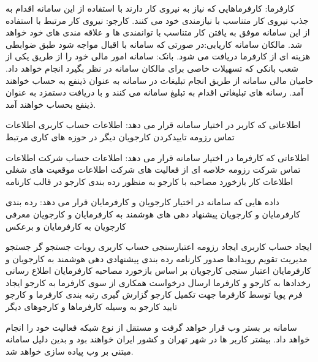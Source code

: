   کارفرما: کارفرماهایی که نیاز به نیروی کار دارند با استفاده از این سامانه اقدام به جذب نیروی کار متناسب با نیازمندی خود می کنند.    
  کارجو: نیروی کار مرتبط با استفاده از این سامانه موفق به یافتن کار متناسب با توانمندی ها و علاقه مندی های خود خواهد شد.
  مالکان سامانه کاریابی:در صورتی که سامانه با اقبال مواجه شود طبق  ضوابطی هزینه ای از کارفرما دریافت می شود.
 بانک: سامانه امور مالی خود را از طریق یکی از شعب بانکی که تسهیلات خاصی برای مالکان سامانه در نظر بگیرد انجام خواهد داد. 
  حامیان مالی سامانه از طریق انجام تبلیغات در سامانه  به عنوان ذینفع به حساب خواهند آمد.
 رسانه های تبلیغاتی اقدام به تبلیغ سامانه می کنند و با دریافت دستمزد به عنوان ذینفع بحساب خواهند آمد.

اطلاعاتی که کاربر در اختیار سامانه قرار می دهد:
 اطلاعات حساب کاربری
 اطلاعات تماس 
 رزومه
 تاییدکردن کارجویان دیگر در حوزه های کاری مرتبط 

اطلاعاتی که کارفرما در اختیار سامانه قرار می دهد:
 اطلاعات حساب شرکت
 اطلاعات تماس شرکت
 رزومه
 خلاصه ای از فعالیت های شرکت
 اطلاعات موقعیت های شغلی
 اطلاعات کار 
 بازخورد مصاحبه با کارجو به منظور رده بندی کارجو در قالب کارنامه

داده هایی که سامانه در اختیار کارجویان و کارفرمایان قرار می دهد:
        رده بندی کارفرمایان و کارجویان 
        پیشنهاد دهی های هوشمند به کارفرمایان و کارجویان 
        معرفی کارجویان به کارفرمایان و برعکس


 ایجاد حساب کاربری
 ایجاد رزومه
 اعتبارسنجی حساب کاربری
 روبات جستجو گر
 جستجو 
 مدیریت تقویم رویدادها
 صدور کارنامه
 رده بندی 
 پیشنهادی دهی هوشمند به کارجویان و کارفرمایان
 اعتبار سنجی کارجویان بر اساس بازخورد مصاحبه کارفرمایان
 اطلاع رسانی رخدادها به کارجو و کارفرما
 ارسال درخواست همکاری از سوی کارفرما به کارجو
 ایجاد فرم پویا توسط کارفرما جهت تکمیل کارجو
 گزارش گیری
 رتبه بندی کارفرما و کارجو 
 تایید کارجو به وسیله کارفرماها و کارجوهای دیگر

سامانه بر بستر وب قرار خواهد گرفت و مستقل از نوع شبکه فعالیت خود را انجام خواهد داد. بیشتر کاربر ها در شهر تهران و کشور ایران خواهند بود و بدین دلیل سامانه مبتنی بر وب پیاده سازی خواهد شد.